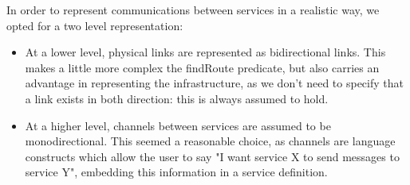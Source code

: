 \documentclass[../DraftNotes.tex]{subfiles}
\begin{document}
In order to represent communications between services in a realistic way, we opted for a two level representation:
\begin{itemize}
 \item At a lower level, physical links are represented as bidirectional links. This makes a little more
 complex the findRoute predicate, but also carries an advantage in representing the infrastructure, as
 we don't need to specify that a link exists in both direction: this is always assumed to hold.
 \item At a higher level, channels between services are assumed to be monodirectional. This seemed a reasonable choice, as channels are language constructs which allow the user to say "I want service X to send messages to service Y", embedding this information in a service definition.
\end{itemize}
\end{document}

